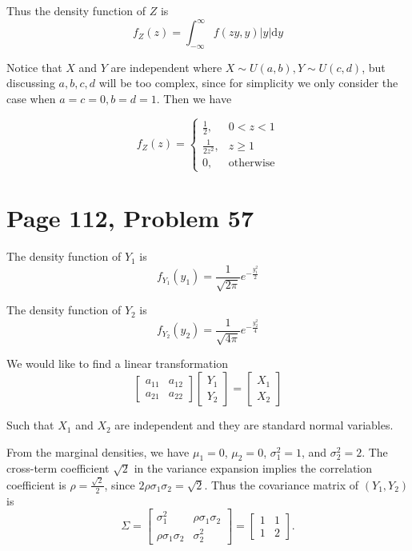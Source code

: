 \documentclass[a4paper, UTF-8]{article}
\theoremstyle{plain}
\begin{document}
Thus the density function of $Z$ is
$$
f_Z(z) = \int_{-\infty}^\infty f(zy, y) |y| \mathrm{d}y
$$

Notice that $X$ and $Y$ are independent where $X \sim U(a, b), Y \sim U(c, d)$, but discussing $a, b, c, d$ will be too complex, since for simplicity we only consider the case when $a = c =0, b = d = 1$. Then we have

$$
f_Z(z) = \begin{cases} 
\frac{1}{2}, & 0 < z < 1\\
\frac{1}{2z^2}, & z \geq 1\\
0, & \text{otherwise}
\end{cases}
$$ 





\section{Page 112, Problem 57}

The density function of $Y_1$ is 
$$
f_{Y_1}(y_1) = \frac{1}{\sqrt{2\pi}}e^{-\frac{y_1^2}{2}}
$$

The density function of $Y_2$ is
$$
f_{Y_2}(y_2) = \frac{1}{\sqrt{4\pi}}e^{-\frac{y_2^2}{4}}
$$

We would like to find a linear transformation 
$$
\begin{bmatrix} 
a_{11} & a_{12} \\ 
a_{21} & a_{22}
\end{bmatrix}
\begin{bmatrix}
Y_1 \\
Y_2
\end{bmatrix}
=
\begin{bmatrix}
X_1 \\
X_2
\end{bmatrix}
$$

Such that $X_1$ and $X_2$ are independent and they are standard normal variables.

From the marginal densities, we have $\mu_1 = 0$, $\mu_2 = 0$, $\sigma_1^2 = 1$, and $\sigma_2^2 = 2$. The cross-term coefficient $\sqrt{2}$ in the variance expansion implies the correlation coefficient is $\rho = \frac{\sqrt{2}}{2}$, since $2\rho\sigma_1\sigma_2 = \sqrt{2}$. Thus the covariance matrix of $(Y_1, Y_2)$ is
$$
\Sigma = \begin{bmatrix} \sigma_1^2 & \rho\sigma_1\sigma_2 \\ \rho\sigma_1\sigma_2 & \sigma_2^2 \end{bmatrix} = \begin{bmatrix} 1 & 1 \\ 1 & 2 \end{bmatrix}.
$$
\end{document}
